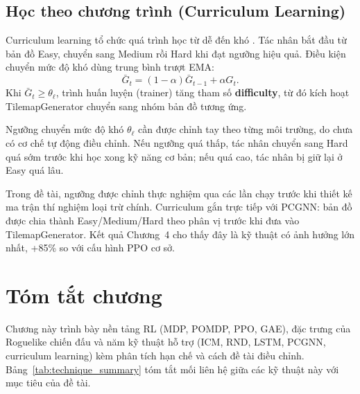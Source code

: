 \subsection{Học theo chương trình (Curriculum Learning)}

Curriculum learning tổ chức quá trình học từ dễ đến khó \cite{Bengio2009}. Tác nhân bắt đầu từ bản đồ Easy, chuyển sang Medium rồi Hard khi đạt ngưỡng hiệu quả. Điều kiện chuyển mức độ khó dùng trung bình trượt EMA:
\begin{equation}
    \bar{G}_t = (1-\alpha)\bar{G}_{t-1} + \alpha G_t.
    \label{eq:curriculum_ema}
\end{equation}
Khi $\bar{G}_t \geq \theta_\ell$, trình huấn luyện (trainer) tăng tham số \textbf{difficulty}, từ đó kích hoạt TilemapGenerator chuyển sang nhóm bản đồ tương ứng.

Ngưỡng chuyển mức độ khó $\theta_\ell$ cần được chỉnh tay theo từng môi trường, do chưa có cơ chế tự động điều chỉnh. Nếu ngưỡng quá thấp, tác nhân chuyển sang Hard quá sớm trước khi học xong kỹ năng cơ bản; nếu quá cao, tác nhân bị giữ lại ở Easy quá lâu.

Trong đề tài, ngưỡng được chỉnh thực nghiệm qua các lần chạy trước khi thiết kế ma trận thí nghiệm loại trừ chính. Curriculum gắn trực tiếp với PCGNN: bản đồ được chia thành Easy/Medium/Hard theo phân vị trước khi đưa vào TilemapGenerator. Kết quả Chương~4 cho thấy đây là kỹ thuật có ảnh hưởng lớn nhất, +85\% so với cấu hình PPO cơ sở.

\section{Tóm tắt chương}

Chương này trình bày nền tảng RL (MDP, POMDP, PPO, GAE), đặc trưng của Roguelike chiến đấu và năm kỹ thuật hỗ trợ (ICM, RND, LSTM, PCGNN, curriculum learning) kèm phân tích hạn chế và cách đề tài điều chỉnh. Bảng~\ref{tab:technique_summary} tóm tắt mối liên hệ giữa các kỹ thuật này với mục tiêu của đề tài.

